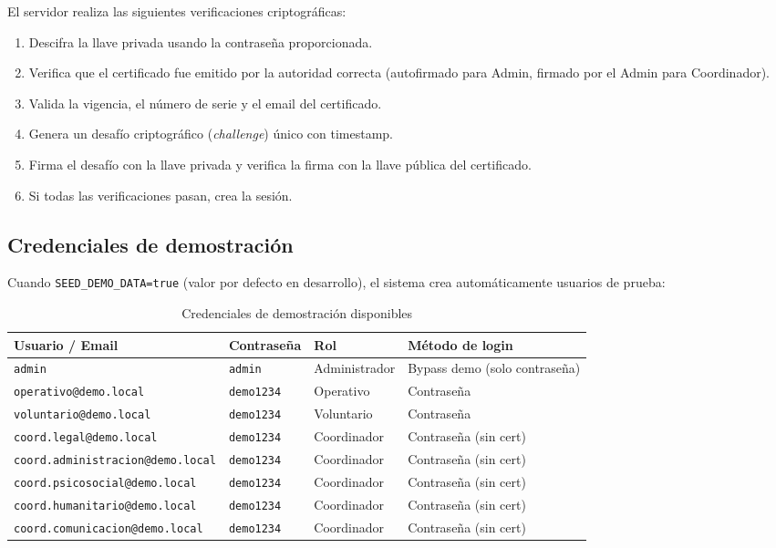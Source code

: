 \documentclass[10pt,letterpaper]{report}
\begin{document}
\begin{infobox}
  El servidor realiza las siguientes verificaciones criptográficas:
  \begin{enumerate}
    \item Descifra la llave privada usando la contraseña proporcionada.
    \item Verifica que el certificado fue emitido por la autoridad correcta (autofirmado para Admin, firmado por el Admin para Coordinador).
    \item Valida la vigencia, el número de serie y el email del certificado.
    \item Genera un desafío criptográfico (\textit{challenge}) único con timestamp.
    \item Firma el desafío con la llave privada y verifica la firma con la llave pública del certificado.
    \item Si todas las verificaciones pasan, crea la sesión.
  \end{enumerate}
\end{infobox}

\subsection{Credenciales de demostración}

Cuando \texttt{SEED\_DEMO\_DATA=true} (valor por defecto en desarrollo), el sistema crea automáticamente usuarios de prueba:

\begin{table}[H]
  \centering
  \caption{Credenciales de demostración disponibles}
  \label{tab:credenciales-demo}
  \begin{tabularx}{\textwidth}{l l l X}
    \toprule
    \textbf{Usuario / Email} & \textbf{Contraseña} & \textbf{Rol} & \textbf{Método de login} \\
    \midrule
    \texttt{admin} & \texttt{admin} & Administrador & Bypass demo (solo contraseña) \\
    \texttt{operativo@demo.local} & \texttt{demo1234} & Operativo & Contraseña \\
    \texttt{voluntario@demo.local} & \texttt{demo1234} & Voluntario & Contraseña \\
    \texttt{coord.legal@demo.local} & \texttt{demo1234} & Coordinador & Contraseña (sin cert) \\
    \texttt{coord.administracion@demo.local} & \texttt{demo1234} & Coordinador & Contraseña (sin cert) \\
    \texttt{coord.psicosocial@demo.local} & \texttt{demo1234} & Coordinador & Contraseña (sin cert) \\
    \texttt{coord.humanitario@demo.local} & \texttt{demo1234} & Coordinador & Contraseña (sin cert) \\
    \texttt{coord.comunicacion@demo.local} & \texttt{demo1234} & Coordinador & Contraseña (sin cert) \\
    \bottomrule
  \end{tabularx}
\end{table}
\end{document}
